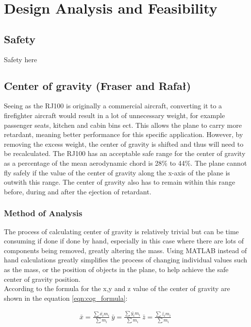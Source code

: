 \chapter{Design Analysis and Feasibility}
\section{Safety}
Safety here



\section{Center of gravity (Fraser and Rafał)}

Seeing as the RJ100 is originally a commercial aircraft, converting it to a firefighter aircraft would result in a lot of unnecessary weight, 
for example passenger seats, kitchen and cabin bins ect.
This allows the plane to carry more retardant, meaning better performance for this specific application.
However, by removing the excess weight, the center of gravity is shifted and thus will need to be recalculated.
The RJ100 has an acceptable safe range for the center of gravity as a percentage of the mean aerodynamic chord is 28\% to 44\%.
The plane cannot fly safely if the value of the center of gravity along the x-axis of the plane is outwith this range.
The center of gravity also has to remain within this range before, during and after the ejection of retardant.

\subsection{Method of Analysis}
The process of calculating center of gravity is relatively trivial but can be time consuming if done if done by hand,
especially in this case where there are lots of components being removed, greatly altering the mass.
Using MATLAB instead of hand calculations greatly simplifies the process of changing individual values such as the mass, or the position of objects in the plane, to help achieve the safe center of gravity position. \\ 

According to \cite{baker2020engineering} the formula for the x,y and z value of the center of gravity are shown in the equation \ref{eqn:cog_formula}:

\begin{equation}
\begin{split}
  \bar{x} = \frac{\sum{ \bar{x_{i}} m_{i} }}{ \sum{ m_{i}}} \
  \bar{y} = \frac{\sum{ \bar{y_{i}} m_{i} }}{ \sum{ m_{i}}} \
  \bar{z} = \frac{\sum{ \bar{z_{i}} m_{i} }}{ \sum{ m_{i}}} \
\end{split}
\label{eqn:cog_formula}
\end{equation}

